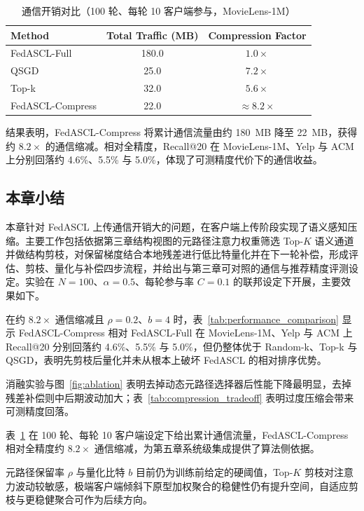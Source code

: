 \begin{table}[H]
    \centering
    \caption{通信开销对比（100 轮、每轮 10 客户端参与，MovieLens-1M）}
    \label{tab:communication_cost}
    \begin{tabular}{lcc}
        \toprule
        Method & Total Traffic (MB) & Compression Factor \\
        \midrule
        FedASCL-Full & 180.0 & $1.0\times$ \\
        QSGD & 25.0 & $7.2\times$ \\
        Top-k & 32.0 & $5.6\times$ \\
        FedASCL-Compress & 22.0 & $\approx 8.2\times$ \\
        \bottomrule
    \end{tabular}
\end{table}

结果表明，FedASCL-Compress 将累计通信流量由约 180~MB 降至 22~MB，获得约 $8.2\times$ 的通信缩减。相对全精度，Recall@20 在 MovieLens-1M、Yelp 与 ACM 上分别回落约 4.6\%、5.5\% 与 5.0\%，体现了可测精度代价下的通信收益。

\subsection{本章小结}

本章针对 FedASCL 上传通信开销大的问题，在客户端上传阶段实现了语义感知压缩。主要工作包括依据第三章结构视图的元路径注意力权重筛选 Top-$K$ 语义通道并做结构剪枝，对保留梯度结合本地残差进行低比特量化并在下一轮补偿，形成评估、剪枝、量化与补偿四步流程，并给出与第三章可对照的通信与推荐精度评测设定。实验在 $N{=}100$、$\alpha{=}0.5$、每轮参与率 $C{=}0.1$ 的联邦设定下开展，主要效果如下。

在约 $8.2\times$ 通信缩减且 $\rho{=}0.2$、$b{=}4$ 时，表~\ref{tab:performance_comparison} 显示 FedASCL-Compress 相对 FedASCL-Full 在 MovieLens-1M、Yelp 与 ACM 上 Recall@20 分别回落约 4.6\%、5.5\% 与 5.0\%，但仍整体优于 Random-k、Top-k 与 QSGD，表明先剪枝后量化并未从根本上破坏 FedASCL 的相对排序优势。

消融实验与图~\ref{fig:ablation} 表明去掉动态元路径选择器后性能下降最明显，去掉残差补偿则中后期波动加大；表~\ref{tab:compression_tradeoff} 表明过度压缩会带来可测精度回落。

表~\ref{tab:communication_cost} 在 100 轮、每轮 10 客户端设定下给出累计通信流量，FedASCL-Compress 相对全精度约 $8.2\times$ 通信缩减，为第五章系统级集成提供了算法侧依据。

元路径保留率 $\rho$ 与量化比特 $b$ 目前仍为训练前给定的硬阈值，Top-$K$ 剪枝对注意力波动较敏感，极端客户端倾斜下原型加权聚合的稳健性仍有提升空间，自适应剪枝与更稳健聚合可作为后续方向。